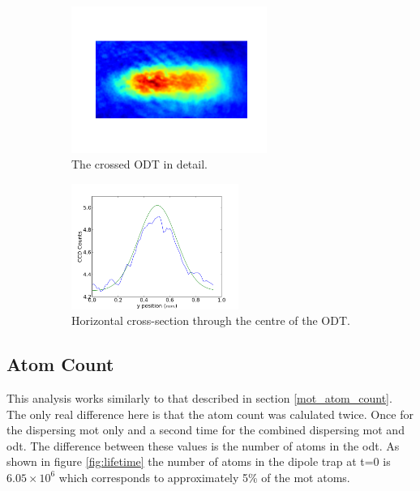 \begin{figure}
    \begin{subfigure}[b]{0.5\textwidth}
        \centering
        \includegraphics[width=0.7\textwidth]{figs/ODTimage1zoom.png}
        \caption{The crossed ODT in detail.}
    \end{subfigure}\begin{subfigure}[b]{0.5\textwidth}
        \centering
        \includegraphics[width=0.6\textwidth]{figs/ODTimage1y.png}
        \caption{Horizontal cross-section through the centre of the ODT.}
    \end{subfigure}

    \caption{}
    \label{fig:ODTimage1}
\end{figure}


\subsection{Atom Count}
This analysis works similarly to that described in section \ref{mot_atom_count}. The only real difference here is that the atom count was calulated twice. Once for the dispersing \gls{mot} only and a second time for the combined dispersing \gls{mot} and \gls{odt}. The difference between these values is the number of atoms in the \gls{odt}. As shown in figure \ref{fig:lifetime} the number of atoms in the dipole trap at t=0 is $6.05\times10^6$ which corresponds to approximately 5\% of the \gls{mot} atoms.

